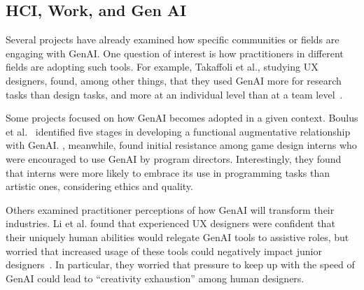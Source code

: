 \subsection{HCI, Work, and Gen AI}
Several projects have already examined how specific communities or fields are engaging with GenAI. One question of interest is how practitioners in different fields are adopting such tools.
For example, Takaffoli et al., studying UX designers, found, among other things, that they used GenAI more for research tasks than design tasks, and more at an individual level than at a team level~\cite{takaffoli2024generative}.


Some projects focused on how GenAI becomes adopted in a given context. Boulus et al.~\cite{boulus2024genai} identified five stages in developing a functional augmentative relationship with GenAI.
\cite{22}, meanwhile, found initial resistance among game design interns who were encouraged to use GenAI by program directors. Interestingly, they found that interns were more likely to embrace its use in programming tasks than artistic ones, considering ethics and quality.

Others examined practitioner perceptions of how GenAI will transform their industries.
Li et al. found that experienced UX designers were confident that their uniquely human abilities would relegate GenAI tools to assistive roles, but worried that increased usage of these tools could negatively impact junior designers~\cite{li2024user}. In particular, they worried that pressure to keep up with the speed of GenAI  could lead to ``creativity exhaustion'' among human designers. 

